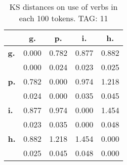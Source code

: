 \begin{table}[h!]
\begin{center}
\begin{tabular}{| l || c | c | c | c |}\hline
 & {\bf g.} & {\bf p.} & {\bf i.} & {\bf h.} \\\hline\hline
{\bf g.} & 0.000 & 0.782 & 0.877 & 0.882 \\
{\bf } & 0.000 & 0.024 & 0.023 & 0.025 \\\hline
{\bf p.} & 0.782 & 0.000 & 0.974 & 1.218 \\
{\bf } & 0.024 & 0.000 & 0.035 & 0.045 \\\hline
{\bf i.} & 0.877 & 0.974 & 0.000 & 1.454 \\
{\bf } & 0.023 & 0.035 & 0.000 & 0.048 \\\hline
{\bf h.} & 0.882 & 1.218 & 1.454 & 0.000 \\
{\bf } & 0.025 & 0.045 & 0.048 & 0.000 \\\hline
\end{tabular}
\caption{KS distances on use of verbs in each 100 tokens. TAG: 11}
\end{center}
\end{table}